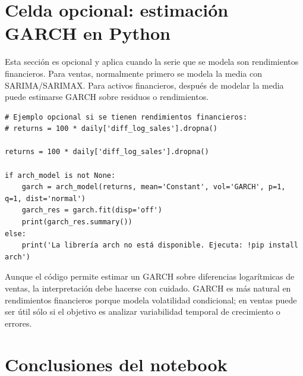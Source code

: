 \documentclass[11pt,letterpaper]{article}
\begin{document}
\section{Celda opcional: estimación GARCH en Python}

\begin{markdowncell}
Esta sección es opcional y aplica cuando la serie que se modela son rendimientos financieros. Para ventas, normalmente primero se modela la media con SARIMA/SARIMAX. Para activos financieros, después de modelar la media puede estimarse GARCH sobre residuos o rendimientos.
\end{markdowncell}

\begin{lstlisting}[style=pythoncolab]
# Ejemplo opcional si se tienen rendimientos financieros:
# returns = 100 * daily['diff_log_sales'].dropna()

returns = 100 * daily['diff_log_sales'].dropna()

if arch_model is not None:
    garch = arch_model(returns, mean='Constant', vol='GARCH', p=1, q=1, dist='normal')
    garch_res = garch.fit(disp='off')
    print(garch_res.summary())
else:
    print('La librería arch no está disponible. Ejecuta: !pip install arch')
\end{lstlisting}

\begin{advertencia}
Aunque el código permite estimar un GARCH sobre diferencias logarítmicas de ventas, la interpretación debe hacerse con cuidado. GARCH es más natural en rendimientos financieros porque modela volatilidad condicional; en ventas puede ser útil sólo si el objetivo es analizar variabilidad temporal de crecimiento o errores.
\end{advertencia}

\section{Conclusiones del notebook}
\end{document}

